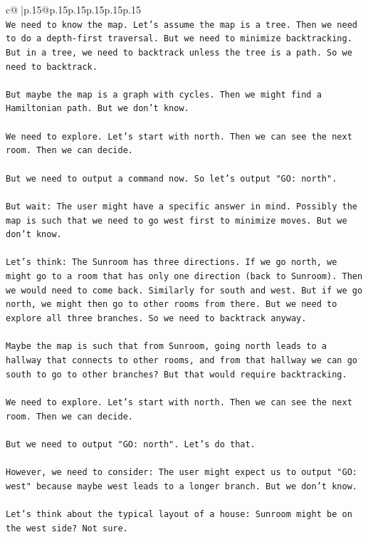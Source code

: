 \documentclass{article}
\begin{document}
{\begin{supertabular}{c@{$\;$}|p{.15\linewidth}@{}p{.15\linewidth}p{.15\linewidth}p{.15\linewidth}p{.15\linewidth}p{.15\linewidth}}
{{{\\ 
\texttt{We need to know the map. Let's assume the map is a tree. Then we need to do a depth{-}first traversal. But we need to minimize backtracking. But in a tree, we need to backtrack unless the tree is a path. So we need to backtrack.} \\
\\ 
\texttt{But maybe the map is a graph with cycles. Then we might find a Hamiltonian path. But we don't know.} \\
\\ 
\texttt{We need to explore. Let's start with north. Then we can see the next room. Then we can decide.} \\
\\ 
\texttt{But we need to output a command now. So let's output "GO: north".} \\
\\ 
\texttt{But wait: The user might have a specific answer in mind. Possibly the map is such that we need to go west first to minimize moves. But we don't know.} \\
\\ 
\texttt{Let's think: The Sunroom has three directions. If we go north, we might go to a room that has only one direction (back to Sunroom). Then we would need to come back. Similarly for south and west. But if we go north, we might then go to other rooms from there. But we need to explore all three branches. So we need to backtrack anyway.} \\
\\ 
\texttt{Maybe the map is such that from Sunroom, going north leads to a hallway that connects to other rooms, and from that hallway we can go south to go to other branches? But that would require backtracking.} \\
\\ 
\texttt{We need to explore. Let's start with north. Then we can see the next room. Then we can decide.} \\
\\ 
\texttt{But we need to output "GO: north". Let's do that.} \\
\\ 
\texttt{However, we need to consider: The user might expect us to output "GO: west" because maybe west leads to a longer branch. But we don't know.} \\
\\ 
\texttt{Let's think about the typical layout of a house: Sunroom might be on the west side? Not sure.} \\
}}}
\end{supertabular}}
\end{document}
